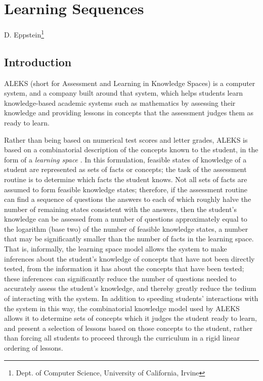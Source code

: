 \documentclass[11pt]{llncs}
\begin{document}
\chapter{Learning Sequences}
\label{Learning Sequences}
\vspace*{-2cm}
{\large D. Eppstein\footnote{Dept. of Computer Science, University of California, Irvine}

\fi

\def\notdiv{\mathop{\not|}}

\section{Introduction}

ALEKS (short for Assessment and Learning in Knowledge Spaces) is a computer system, and a company built around that system, which helps students learn knowledge-based academic systems such as mathematics by assessing their knowledge and providing lessons in concepts that the assessment judges them as ready to learn.

Rather than being based on numerical test scores and letter grades, ALEKS is based on a combinatorial description of the concepts known to the student, in the form of a \emph{learning space} \citep{doign99}. In this formulation, feasible states of knowledge of a student are represented as sets of facts or concepts; the task of the assessment routine is to determine which facts the student knows. Not all sets of facts are assumed to form feasible knowledge states; therefore, if the assessment routine can find a sequence of questions the answers to each of which roughly halve the number of remaining states consistent with the answers, then the student's knowledge can be assessed from a number of questions approximately equal to the logarithm (base two) of the number of feasible knowledge states, a number that may be significantly smaller than the number of facts in the learning space. That is, informally, the learning space model allows the system to make inferences about the student's knowledge of concepts that have not been directly tested, from the information it has about the concepts that have been tested; these inferences can significantly reduce the number of questions needed to accurately assess the student's knowledge, and thereby greatly reduce the tedium of interacting with the system. In addition to speeding students' interactions with the system in this way, the combinatorial knowledge model used by ALEKS allows it to determine sets of concepts which it judges the student ready to learn, and present a selection of lessons based on those concepts to the student, rather than forcing all students to proceed through the curriculum in a rigid linear ordering of lessons.

}
\end{document}
